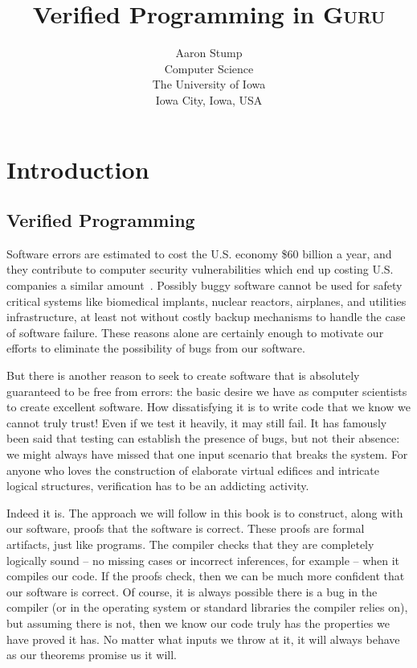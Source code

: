 \documentclass{book}[12pt]
\newcommand{\guru}[0]{\textsc{Guru}\xspace}
\begin{document}
\title{Verified Programming in \guru}

\author{Aaron Stump \\
Computer Science \\
The University of Iowa \\
Iowa City, Iowa, USA
}

\maketitle

\tableofcontents

\chapter{Introduction}
\label{ch1}

\section{Verified Programming}

Software errors are estimated to cost the U.S. economy \$60 billion a
year, and they contribute to computer security vulnerabilities which
end up costing U.S. companies a similar amount~\cite{nist02,fbi05}.
Possibly buggy software cannot be used for safety critical systems
like biomedical implants, nuclear reactors, airplanes, and utilities
infrastructure, at least not without costly backup mechanisms to
handle the case of software failure.  These reasons alone are certainly
enough to motivate our efforts to eliminate the possibility of bugs 
from our software.

But there is another reason to seek to create software that is
absolutely guaranteed to be free from errors: the basic desire we have
as computer scientists to create excellent software.  How
dissatisfying it is to write code that we know we cannot truly trust!
Even if we test it heavily, it may still fail.  It has famously been
said that testing can establish the presence of bugs, but not their
absence: we might always have missed that one input scenario that
breaks the system.  For anyone who loves the construction of elaborate
virtual edifices and intricate logical structures, verification has to
be an addicting activity.

Indeed it is.  The approach we will follow in this book is to
construct, along with our software, proofs that the software is
correct.  These proofs are formal artifacts, just like programs.  The
compiler checks that they are completely logically sound -- no missing
cases or incorrect inferences, for example -- when it compiles our
code.  If the proofs check, then we can be much more confident that
our software is correct.  Of course, it is always possible there is a
bug in the compiler (or in the operating system or standard libraries
the compiler relies on), but assuming there is not, then we know our
code truly has the properties we have proved it has.  No matter what
inputs we throw at it, it will always behave as our theorems promise
us it will.
\end{document}
